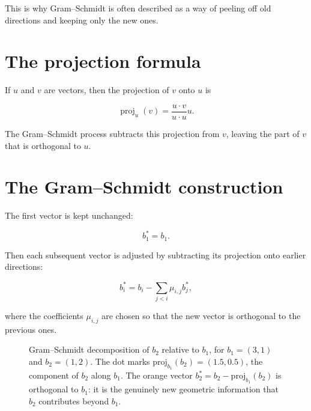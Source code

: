 This is why Gram--Schmidt is often described as a way of peeling off old directions and keeping only the new ones.

\section{The projection formula}
If $u$ and $v$ are vectors, then the projection of $v$ onto $u$ is

\[
\operatorname{proj}_u(v)=\frac{u\cdot v}{u\cdot u}u.
\]

The Gram--Schmidt process subtracts this projection from $v$, leaving the part of $v$ that is orthogonal to $u$.

\section{The Gram--Schmidt construction}
The first vector is kept unchanged:

\[
b_1^* = b_1.
\]

Then each subsequent vector is adjusted by subtracting its projection onto earlier directions:

\[
b_i^* = b_i - \sum_{j<i} \mu_{i,j} b_j^*,
\]

where the coefficients $\mu_{i,j}$ are chosen so that the new vector is orthogonal to the previous ones.

\begin{figure}[H]
\centering
{}
\caption{Gram--Schmidt decomposition of $b_2$ relative to $b_1$, for $b_1=(3,1)$ and $b_2=(1,2)$. The dot marks $\mathrm{proj}_{b_1}(b_2)=(1.5,0.5)$, the component of $b_2$ along $b_1$. The orange vector $b_2^{*}=b_2-\mathrm{proj}_{b_1}(b_2)$ is orthogonal to $b_1$: it is the genuinely new geometric information that $b_2$ contributes beyond $b_1$.}
\label{fig:gram-schmidt}
\end{figure}

